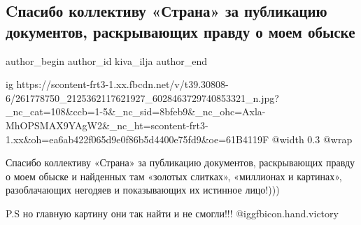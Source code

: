  
 
 
 
 
 
\subsection{Cпасибо коллективу «Страна» за публикацию документов, раскрывающих правду о моем обыске}
\label{sec:02_12_2021.fb.kiva_ilja.1.spasibo_strana}
 
\ifcmt
 author_begin
   author_id kiva_ilja
 author_end
\fi

\ifcmt
  ig https://scontent-frt3-1.xx.fbcdn.net/v/t39.30808-6/261778750_2125362117621927_6028463729740853321_n.jpg?_nc_cat=108&ccb=1-5&_nc_sid=8bfeb9&_nc_ohc=Axla-MhOPSMAX9YAgW2&_nc_ht=scontent-frt3-1.xx&oh=ea6ab422f065d9e0f86b5d4400e75fd9&oe=61B4119F
  @width 0.3
  @wrap 
\fi

Спасибо коллективу «Страна» за публикацию документов, раскрывающих правду о
моем обыске и найденных там «золотых слитках», «миллионах и картинах»,
разоблачающих негодяев и показывающих их истинное лицо!))) 

P.S но главную картину они так найти и не смогли!!! @igg{fbicon.hand.victory}

\vspace{2cm}

